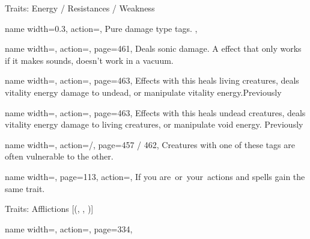 \begin{PageFront}
\begin{Tables}{\frontTableHeight}
\begin{Table}{Traits: Energy / Resistances / Weakness}
            \begin{entry}{}{%
                name width=0.3,%
                action=\stackbox[l][c]{\Acid\Cold\Electricity\Fire\Force}, }
                Pure damage type tags. ,
            \end{entry}
            \begin{entry}{}{%
                name width=\conditionLength,%
                action=\Sonic,
                page=461,
            }
                Deals sonic damage. A effect that only works if it makes sounds, doesn't work in a vacuum. \hfill {}
            \end{entry}
            \begin{entry}{}{%
                name width=\conditionLength,%
                action=\Vitality,
                page=463,
            }
                Effects with this heals living creatures, deals vitality energy damage to undead, or manipulate
                vitality energy.\hfill Previously \Positive
            \end{entry}
            \begin{entry}{}{%
                name width=\conditionLength,%
                action=\Void,
                page=463,
            }
                Effects with this heals undead creatures, deals vitality energy damage to living creatures, or
                manipulate void energy. \hfill Previously \Negative
            \end{entry}
            \begin{entry}{}{%
                name width=\conditionLength,%
                action=\Holy /\Unholy,
                page=457 / 462,
            }
                Creatures with one of these tags are often vulnerable to the other.
            \end{entry}
            \begin{entry}{}{%
                name width=\conditionLength,%
                page=113,
                action=\Sanctified,
            }
                If you are \Holy\,or \Unholy\,your \Sanctified\,actions and spells gain the same trait.
            \end{entry}
        \end{Table}
        \TableSpace
        \begin{Table}{Traits: Afflictions }[{(, , )}]
            \begin{entry}{}{%
                name width=\conditionLength,%
                action=\Virulent,
                page=334,
            }

\end{entry}
\end{Table}
\end{Tables}
\end{PageFront}
